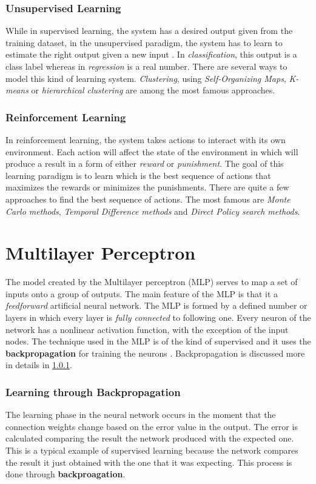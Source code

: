 \subsubsection{Unsupervised Learning}
While in supervised learning, the system has a desired output given from the training dataset, in the unsupervised paradigm, the system has to learn to estimate the right output given a new input \cite{ghahramani2004unsupervised}. In \textit{classification}, this output is a class label whereas in \textit{regression} is a real number. There are several ways to model this kind of learning system. \textit{Clustering}, using \textit{Self-Organizing Maps}, \textit{K-means} or \textit{hierarchical clustering} are among the most famous approaches.

\subsubsection{Reinforcement Learning}
In reinforcement learning, the system takes actions to interact with its own environment. Each action will affect the state of the environment in which will produce a result in a form of either \textit{reward} or \textit{punishment}. The goal of this learning paradigm is to learn which is the best sequence of actions that maximizes the rewards or minimizes the punishments. There are quite a few approaches to find the best sequence of actions. The most famous are \textit{Monte Carlo methods}, \textit{Temporal Difference methods} and \textit{Direct Policy search methods}.

\section{Multilayer Perceptron}
The model created by the Multilayer perceptron (MLP) serves to map a set of inputs onto a group of outputs. The main feature of the MLP is that it a \textit{feedforward} artificial neural network. The MLP is formed by a defined number or layers in which every layer is \textit{fully connected} to following one. Every neuron of the network has a nonlinear activation function, with the exception of the input nodes. The technique used in the MLP is of the kind of supervised and it uses the \textbf{backpropagation} for training the neurons \cite{mlp_wiki}. Backpropagation is discussed more in details in \ref{ssec:backprop}.

\subsubsection{Learning through Backpropagation} \label{ssec:backprop}
The learning phase in the neural network occurs in the moment that the connection weights change based on the error value in the output. The error is calculated comparing the result the network produced with the expected one. This is a typical example of supervised learning because the network compares the result it just obtained with the one that it was expecting. This process is done through \textbf{backproagation}. \\

